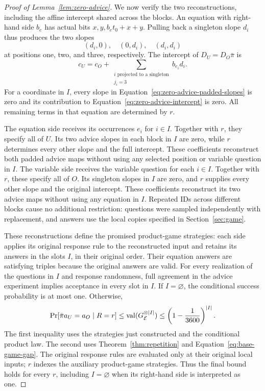 \begin{proof}[Proof of Lemma~\ref{lem:zero-advice}]
We now verify the two reconstructions, including the affine intercept
shared across the blocks.  An equation with right-hand side $b_e$ has actual
bits $x,y,b_e t_0+x+y$.  Pulling back a singleton slope $d_i$ thus
produces the two slopes
\begin{equation}
 (d_i,0),\quad (0,d_i),\quad (d_i,d_i)
 \label{eq:zero-advice-padded-slopes}
\end{equation}
at positions one, two, and three, respectively.  The intercept of
$D_U=D_O\bar\pi$ is
\begin{equation}
 c_U=c_O+
 \sum_{\substack{i\text{ projected to a singleton}\\j_i=3}}
 b_{e_i}d_i.
 \label{eq:zero-advice-intercept}
\end{equation}
For a coordinate in $I$, every slope in
Equation~\eqref{eq:zero-advice-padded-slopes} is zero and its contribution to
Equation~\eqref{eq:zero-advice-intercept} is zero.  All remaining terms in
that equation are determined by $r$.

The equation side receives its occurrences $e_i$ for $i\in I$.
Together with $r$, they specify all of $U$.  Its two advice slopes in
each block in $I$ are zero, while $r$ determines every other slope and
the full intercept.  These coefficients reconstruct both padded advice
maps without using any selected position or variable question in $I$.
The variable side receives the variable question for each $i\in I$.
Together with $r$, these specify all of $O$.  Its singleton
slopes in $I$ are zero, and $r$ supplies every other slope and the original
intercept.  These coefficients reconstruct its two advice maps without
using any equation in $I$.  Repeated IDs across different blocks cause no
additional restriction: questions were sampled independently with
replacement, and answers use the local copies specified in
Section~\ref{sec:game}.

These reconstructions define the promised product-game strategies:
each side applies its original response rule to the reconstructed
input and retains its answers in the slots $I$, in their original
order.  Their equation answers are satisfying triples because the
original answers are valid.  For every realization of the questions in $I$ and response randomness, full agreement in the advice
experiment implies acceptance in every slot in $I$.  If $I=\varnothing$,
the conditional success probability is at most one.  Otherwise,
\[
 \Pr[\bar\pi a_U=a_O\mid R=r]
 \le \operatorname{val}(G_{\mathcal E}^{\otimes\lvert I\rvert})
 \le \left(1-\frac{1}{3600}\right)^{\lvert I\rvert}.
\]
The first inequality uses the strategies just constructed and the
conditional product law.  The second uses
Theorem~\ref{thm:repetition} and Equation~\eqref{eq:base-game-gap}.
The original response rules are evaluated only at their original
local inputs; $r$ indexes the auxiliary product-game strategies.
Thus the final bound holds for every $r$, including $I=\varnothing$
when its right-hand side is interpreted as one.


\end{proof}
